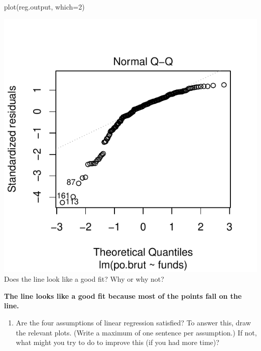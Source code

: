 \documentclass[
]{article}
\newenvironment{Shaded}{\begin{snugshade}}{\end{snugshade}}
\newcommand{\AttributeTok}[1]{\textcolor[rgb]{0.77,0.63,0.00}{#1}}
\newcommand{\DecValTok}[1]{\textcolor[rgb]{0.00,0.00,0.81}{#1}}
\newcommand{\FunctionTok}[1]{\textcolor[rgb]{0.00,0.00,0.00}{#1}}
\newcommand{\NormalTok}[1]{#1}
\providecommand{\tightlist}{%
  \setlength{\itemsep}{0pt}\setlength{\parskip}{0pt}}
\begin{document}
\begin{Shaded}
\begin{Highlighting}[]
\FunctionTok{plot}\NormalTok{(reg.output, }\AttributeTok{which=}\DecValTok{2}\NormalTok{)}
\end{Highlighting}
\end{Shaded}

\includegraphics{Assignments_files/figure-latex/unnamed-chunk-36-6.pdf}
Does the line look like a good fit? Why or why not?

\textbf{The line looks like a good fit because most of the points fall
on the line.}

\begin{enumerate}
\def\labelenumi{\alph{enumi}.}
\setcounter{enumi}{3}
\tightlist
\item
  Are the four assumptions of linear regression satisfied? To answer
  this, draw the relevant plots. (Write a maximum of one sentence per
  assumption.) If not, what might you try to do to improve this (if you
  had more time)?
\end{enumerate}
\end{document}
